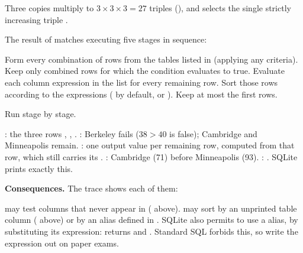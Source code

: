 \documentclass[10pt]{scrartcl}
\begin{document}
\medskip
Three copies multiply to $3 \times 3 \times 3 = 27$ triples (), and  selects the single strictly increasing triple .

\begin{proposition*}
The result of  matches executing five stages in sequence:
\begin{enumerate}[(1)]
  \ii Form every combination of rows from the tables listed in  (applying any  criteria).
  \ii Keep only combined rows for which the  condition evaluates to true.
  \ii Evaluate each column expression in the  list for every remaining row.
  \ii Sort those rows according to the  expressions ( by default, or ).
  \ii Keep at most the first  rows.
\end{enumerate}
\end{proposition*}

\begin{example*}
Run  stage by stage.
\begin{steps}
  \ii {}: the three rows , , .
  \ii {}: Berkeley fails ($38 > 40$ is false); Cambridge and Minneapolis remain.
  \ii {}: one output value per remaining row, computed from that row, which still carries its .
  \ii {}: Cambridge (71) before Minneapolis (93).
  \ii {}: . SQLite prints exactly this.
\end{steps}
\end{example*}
\noindent\textbf{Consequences.} The trace shows each of them:
\begin{itemize}
  \ii {} may test columns that never appear in  ( above).
  \ii {} may sort by an unprinted table column ( above) or by an  alias defined in .
  \ii SQLite also permits  to use a  alias, by substituting its expression:  returns  and . Standard SQL forbids this, so write the expression out on paper exams.
\end{itemize}
\end{document}
